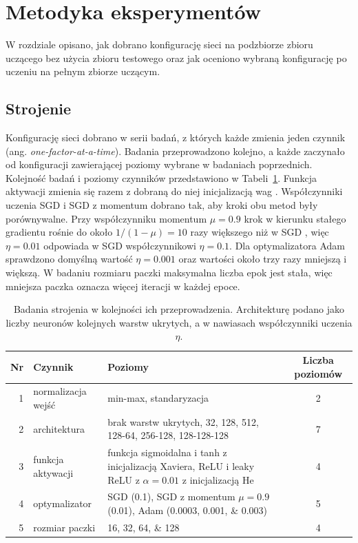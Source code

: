 \section{Metodyka eksperymentów}
\label{sec:methodology}

W rozdziale opisano, jak dobrano konfigurację sieci na podzbiorze zbioru uczącego bez użycia zbioru testowego oraz jak oceniono wybraną konfigurację po uczeniu na pełnym zbiorze uczącym.

\subsection{Strojenie}
\label{sec:methodology-tuning}

Konfigurację sieci dobrano w serii badań, z których każde zmienia jeden czynnik (ang. \textit{one-factor-at-a-time}). Badania przeprowadzono kolejno, a każde zaczynało od konfiguracji zawierającej poziomy wybrane w badaniach poprzednich. Kolejność badań i poziomy czynników przedstawiono w Tabeli~\ref{tab:tuning-studies}. Funkcja aktywacji zmienia się razem z dobraną do niej inicjalizacją wag \cite[rozdz.~3.6]{gracikowski2026}. Współczynniki uczenia SGD i SGD z momentum dobrano tak, aby kroki obu metod były porównywalne. Przy współczynniku momentum $\mu = \num{0.9}$ krok w kierunku stałego gradientu rośnie do około $1/(1 - \mu) = 10$ razy większego niż w SGD \cite[rozdz.~8.3.2]{goodfellow2016}, więc $\eta = \num{0.01}$ odpowiada w SGD współczynnikowi $\eta = \num{0.1}$. Dla optymalizatora Adam sprawdzono domyślną wartość $\eta = \num{0.001}$ \cite{kingma2015} oraz wartości około trzy razy mniejszą i większą. W badaniu rozmiaru paczki maksymalna liczba epok jest stała, więc mniejsza paczka oznacza więcej iteracji w każdej epoce.

\begin{table}[H]
    \centering
    \caption{Badania strojenia w kolejności ich przeprowadzenia. Architekturę podano jako liczby neuronów kolejnych warstw ukrytych, a w nawiasach współczynniki uczenia $\eta$.}
    \label{tab:tuning-studies}
    \begin{tabularx}{\textwidth}{rlXc}
        \toprule
        Nr & Czynnik & Poziomy & Liczba poziomów \\
        \midrule
        1 & normalizacja wejść & min-max, standaryzacja & 2 \\
        2 & architektura & brak warstw ukrytych, 32, 128, 512, \mbox{128-64}, \mbox{256-128}, \mbox{128-128-128} & 7 \\
        3 & funkcja aktywacji & funkcja sigmoidalna i tanh z inicjalizacją Xaviera, ReLU i leaky ReLU z $\alpha = \num{0.01}$ z inicjalizacją He & 4 \\
        4 & optymalizator & SGD (\num{0.1}), SGD z momentum $\mu = \num{0.9}$ (\num{0.01}), Adam (\numlist{0.0003;0.001;0.003}) & 5 \\
        5 & rozmiar paczki & \numlist{16;32;64;128} & 4 \\
        \bottomrule
    \end{tabularx}
\end{table}

